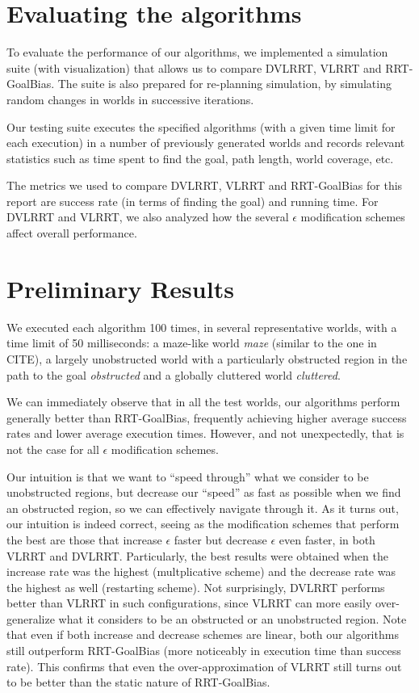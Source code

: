 \documentclass[10pt,twoside,twocolumn]{article}
\begin{document}
\section{Evaluating the algorithms}

To evaluate the performance of our algorithms, we implemented a simulation suite (with visualization) that allows
us to compare DVLRRT, VLRRT and RRT-GoalBias. The suite is also prepared for re-planning simulation, by simulating
random changes in worlds in successive iterations.

Our testing suite executes the specified algorithms (with a given time limit for each execution) in a number of previously
generated worlds and records relevant statistics such as time spent to find the goal, path length, world coverage, etc.

The metrics we used to compare DVLRRT, VLRRT and RRT-GoalBias for this report are success rate (in terms of finding the goal) and running
time. For DVLRRT and VLRRT, we also analyzed how the several $\epsilon$ modification schemes affect overall performance.

\section{Preliminary Results}

We executed each algorithm 100 times, in several representative worlds, with a time limit of 50 milliseconds: 
a maze-like world \emph{maze} (similar to the one in CITE), a largely unobstructed world with a particularly obstructed region in
the path to the goal \emph{obstructed} and a globally cluttered world \emph{cluttered}.

We can immediately observe that in all the test worlds, our algorithms perform generally better than RRT-GoalBias,
frequently achieving higher average success rates and lower average execution times. However, and not unexpectedly,
that is not the case for all $\epsilon$ modification schemes. 

Our intuition is that we want to ``speed through'' what we consider to be unobstructed regions, but decrease our
``speed'' as fast as possible when we find an obstructed region, so we can effectively navigate through it. As it turns
out, our intuition is indeed correct, seeing as the modification schemes that perform the best are those that
increase $\epsilon$ faster but decrease $\epsilon$ even faster, in both VLRRT and DVLRRT. Particularly, the best
results were obtained when the increase rate was the highest (multplicative scheme) and the decrease rate was the 
highest as well (restarting scheme).
Not surprisingly,
DVLRRT performs better than VLRRT in such configurations, since VLRRT can more easily over-generalize what it
considers to be an obstructed or an unobstructed region. Note that even if both increase and decrease schemes are
linear, both our algorithms still outperform RRT-GoalBias (more noticeably in execution time than success rate). This
confirms that even the over-approximation of VLRRT still turns out to be better than the static nature of RRT-GoalBias.
\end{document}
